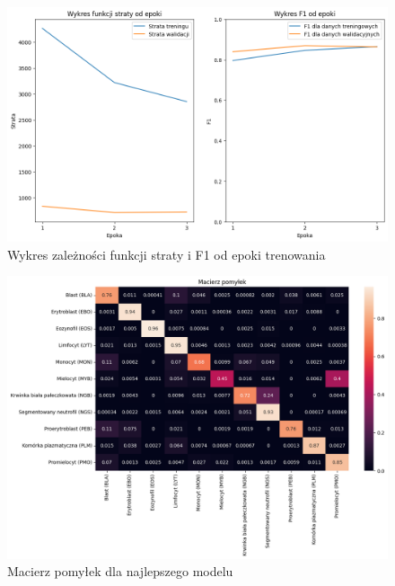 \begin{figure}
    \centering
    \includegraphics[width=\textwidth]{experiments/efficientnet_b0/combined}
    \caption{Wykres zależności funkcji straty i F1 od epoki trenowania}
\end{figure}

\begin{figure}
    \centering
    \includegraphics[width=\textwidth]{experiments/efficientnet_b0/confusion_matrix}
    \caption{Macierz pomyłek dla najlepszego modelu}
\end{figure}

